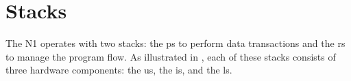
\section{Stacks}
\label{stacks}

The N1 operates with two stacks: the \gls{ps} to perform data transactions and the
\gls{rs} to manage the program flow. As illustrated in , each of
these stacks consists of three hardware components: the \gls{us}, the \gls{is},
and the \gls{ls}.

